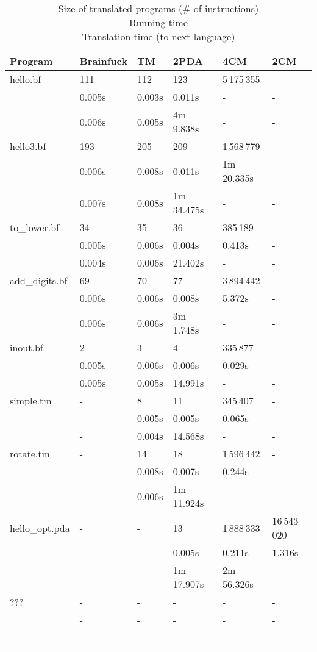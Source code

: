 \documentclass[english,shortabstract,mgr]{iithesis}
\begin{document}
\begin{table}[]
\centering
\caption{
Size of translated programs (\# of instructions)\\
Running time \\
Translation time (to next language)\\
}
\begin{center}
\label{t:my-label}
\begin{tabular}{llllll}
Program & Brainfuck & TM & 2PDA & 4CM & 2CM \\
\hline
hello.bf & 111 & 112 & 123 & 5\,175\,355 & -\\
 & 0.005s & 0.003s & 0.011s & - & - \\
 & 0.006s & 0.005s & 4m 9.838s & - & - \\
\hline
hello3.bf & 193 & 205 & 209 & 1\,568\,779 & -\\
 & 0.006s & 0.008s & 0.011s & 1m 20.335s & - \\
 & 0.007s & 0.008s & 1m 34.475s & - & - \\
\hline
to\_lower.bf & 34 & 35 & 36 & 385\,189 & -\\
 & 0.005s & 0.006s & 0.004s & 0.413s & - \\
 & 0.004s & 0.006s & 21.402s & - & - \\
\hline
add\_digits.bf & 69 & 70 & 77 & 3\,894\,442 & -\\
 & 0.006s & 0.006s & 0.008s & 5.372s & - \\
 & 0.006s & 0.006s & 3m 1.748s & - & - \\
\hline
inout.bf & 2 & 3 & 4 & 335\,877 & -\\
 & 0.005s & 0.006s & 0.006s & 0.029s & - \\
 & 0.005s & 0.005s & 14.991s & - & - \\
\hline
simple.tm & - & 8 & 11 & 345\,407 & -\\
 & - & 0.005s & 0.005s & 0.065s & - \\
 & - & 0.004s & 14.568s & - & - \\
\hline
rotate.tm & - & 14 & 18 & 1\,596\,442 & -\\
 & - & 0.008s & 0.007s & 0.244s & - \\
 & - & 0.006s & 1m 11.924s & - & - \\
\hline
hello\_opt.pda & - & - & 13 & 1\,888\,333 & 16\,543\,020\\
 & - & - & 0.005s & 0.211s & 1.316s \\
 & - & - & 1m 17.907s & 2m 56.326s & - \\
\hline
??? & - & - & - & - & -\\
 & - & - & - & - & - \\
 & - & - & - & - & - \\
\end{tabular}
\end{center}
\end{table}
\end{document}
